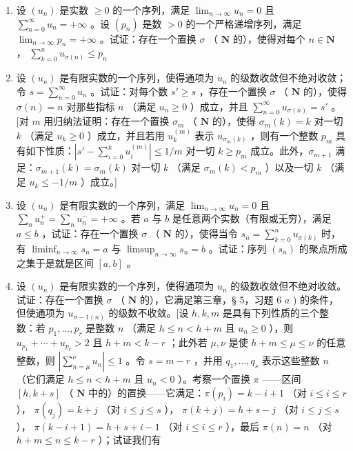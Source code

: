 \begin{enumerate}
\def\labelenumi{\arabic{enumi})}
\setcounter{enumi}{12}
\item
设 \((u_n)\) 是实数 \(\geqslant 0\) 的一个序列，满足 \(\lim_{n\to \infty}u_n = 0\) 且 \(\sum_{n = 0}^{\infty}u_n = +\infty\) 。设 \((p_n)\) 是数 \(>0\) 的一个严格递增序列，满足 \(\lim_{n\to \infty}p_n = +\infty\) 。试证：存在一个置换 \(\sigma\) （ \(\mathbf{N}\) 的），使得对每个 \(n\in \mathbf{N}\) ， \(\sum_{k = 0}^{n}u_{\sigma (n)}\leqslant p_n\)
\item
设 \((u_{n})\) 是有限实数的一个序列，使得通项为 \(u_{n}\) 的级数收敛但不绝对收敛；令 \(s = \sum_{n=0}^{\infty} u_{n}\) 。试证：对每个数 \(s' \geqslant s\) ，存在一个置换 \(\sigma\) （ \(\mathbf{N}\) 的），使得 \(\sigma(n) = n\) 对那些指标 \(n\) （满足 \(u_{n} \geqslant 0\) ）成立，并且 \(\sum_{n=0}^{\infty} u_{\sigma(n)} = s'\) 。{[}对 \(m\) 用归纳法证明：存在一个置换 \(\sigma_m\) （ \(\mathbf{N}\) 的），使得 \(\sigma_m(k) = k\) 对一切 \(k\) （满足 \(u_k \geqslant 0\) ）成立，并且若用 \(u_k^{(m)}\) 表示 \(u_{\sigma_m(k)}\) ，则有一个整数 \(p_m\) 具有如下性质：\(\left| s' - \sum_{i=0}^{k} u_i^{(m)} \right| \leqslant 1/m\) 对一切 \(k \geqslant p_m\) 成立。此外，\(\sigma_{m+1}\) 满足：\(\sigma_{m+1}(k) = \sigma_m(k)\) 对一切 \(k\) （满足 \(\sigma_m(k) < p_m\) ）以及一切 \(k\) （满足 \(u_k \leqslant -1/m\) ）成立。{]}
\item
设 \((u_{n})\) 是有限实数的一个序列，满足 \(\lim_{n\to \infty}u_n = 0\) 且 \(\sum_{n}u_{n}^{+} = \sum_{n}u_{n}^{-} = +\infty\) 。若 \(a\) 与 \(b\) 是任意两个实数（有限或无穷），满足 \(a\leqslant b\) ，试证：存在一个置换 \(\sigma\) （ \(\mathbf{N}\) 的），使得当令 \(s_n = \sum_{k = 0}^n u_{\sigma (k)}\) 时，有 \(\liminf_{n\to \infty}s_n = a\) 与 \(\limsup_{n\to \infty}s_n = b\) 。试证：序列 \((s_n)\) 的聚点所成之集于是就是区间 \([a,b]\) 。
\item
设 \((u_n)\) 是有限实数的一个序列，使得通项为 \(u_n\) 的级数收敛但不绝对收敛。试证：存在一个置换 \(\sigma\) （ \(\mathbf{N}\) 的），它满足第三章，§ 5，习题 6 \(a\) ) 的条件，但使通项为 \(u_{\sigma - 1(n)}\) 的级数不收敛。{[}设 \(h, k, m\) 是具有下列性质的三个整数：若 \(p_1, \ldots, p_r\) 是整数 \(n\) （满足 \(h \leqslant n < h + m\) 且 \(u_n \geqslant 0\) ），则 \(u_{p_1} + \cdots + u_{p_r} > 2\) 且 \(h + m < k - r\) ；此外若 \(\mu, \nu\) 是使 \(h + m \leqslant \mu \leqslant \nu\) 的任意整数，则 \(\left|\sum_{n = \mu}^{\nu} u_n\right| \leqslant 1\) 。令 \(s = m - r\) ，并用 \(q_1, \ldots, q_s\) 表示这些整数 \(n\) （它们满足 \(h \leqslant n < h + m\) 且 \(u_n < 0\) ）。考察一个置换 \(\pi\) ——区间 \([h, k + s]\) （ \(\mathbf{N}\) 中的）的置换——它满足：\(\pi(p_i) = k - i + 1\) （对 \(i \leqslant i \leqslant r\) ）， \(\pi(q_j) = k + j\) （对 \(i \leqslant j \leqslant s\) ）， \(\pi(k + j) = h + s - j\) （对 \(i \leqslant j \leqslant s\) ）， \(\pi(k - i + 1) = h + s + i - 1\) （对 \(i \leqslant i \leqslant r\) ），最后 \(\pi(n) = n\) （对 \(h + m \leqslant n \leqslant k - r\) ）；试证我们有
\end{enumerate}


